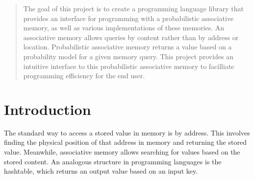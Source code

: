 \documentclass{sig-alternate}
\begin{document}
\begin{abstract}
    The goal of this project is to create a programming language library that provides an interface
    for programming with a probabilistic associative memory, as well as various implementations of these memories. 
    An associative memory allows queries by content rather than by address or location.
    Probabilistic associative memory returns a value based on a probability model
    for a given memory query. This project provides an intuitive interface to this probabilistic
    associative memory to facilliate programming efficiency for the end user.

    
\end{abstract}

\section{Introduction}
\label{sec:intro}

The standard way to access a stored value in memory is by address. 
This involves finding the physical position of that address in memory
and returning the stored value. Meanwhile, associative memory allows
searching for values based on the stored content. An analogous structure
in programming languages is the hashtable, which returns an output value
based on an input key. 
\end{document}
